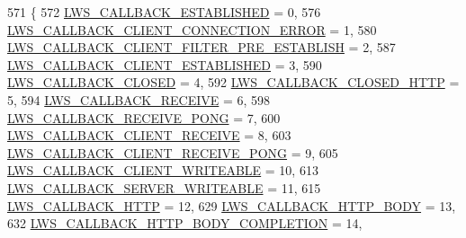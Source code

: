 \begin{DoxyCode}
571                           \{
572         \hyperlink{group__usercb_ggad62860e19975ba4c4af401c3cdb6abf7a24d39bf1cfc0bad9d92da9ac1717e439}{LWS\_CALLBACK\_ESTABLISHED}                                =  0,
576         \hyperlink{group__usercb_ggad62860e19975ba4c4af401c3cdb6abf7ad8c6207b0c4e732f3d507f0fb79370e8}{LWS\_CALLBACK\_CLIENT\_CONNECTION\_ERROR}                        =  
      1,
580         \hyperlink{group__usercb_ggad62860e19975ba4c4af401c3cdb6abf7aa536e574a642ff3ab9e12bff7ba2c6a2}{LWS\_CALLBACK\_CLIENT\_FILTER\_PRE\_ESTABLISH}                =  
      2,
587         \hyperlink{group__usercb_ggad62860e19975ba4c4af401c3cdb6abf7a7e12418eec9bce85735e6460176ab604}{LWS\_CALLBACK\_CLIENT\_ESTABLISHED}                          =  3,
590         \hyperlink{group__usercb_ggad62860e19975ba4c4af401c3cdb6abf7a48a9590e5e18c7920282e094a0bfd9d8}{LWS\_CALLBACK\_CLOSED}                                  =  4,
592         \hyperlink{group__usercb_ggad62860e19975ba4c4af401c3cdb6abf7a838b18d255c1b94a533287ba302a2eba}{LWS\_CALLBACK\_CLOSED\_HTTP}                                =  5,
594         \hyperlink{group__usercb_ggad62860e19975ba4c4af401c3cdb6abf7a492c1b1c0ac0ed980042ee732fe2990c}{LWS\_CALLBACK\_RECEIVE}                                        =  6,
598         \hyperlink{group__usercb_ggad62860e19975ba4c4af401c3cdb6abf7a2db02fc6e1c17ab62b52109d1aa9d738}{LWS\_CALLBACK\_RECEIVE\_PONG}                              =  7,
600         \hyperlink{group__usercb_ggad62860e19975ba4c4af401c3cdb6abf7abbbe7a0a67c5866ca9109d46823fc5b1}{LWS\_CALLBACK\_CLIENT\_RECEIVE}                          =  8,
603         \hyperlink{group__usercb_ggad62860e19975ba4c4af401c3cdb6abf7a136a7cec11c3afd13245623bd84e76c9}{LWS\_CALLBACK\_CLIENT\_RECEIVE\_PONG}                        =  9,
605         \hyperlink{group__usercb_ggad62860e19975ba4c4af401c3cdb6abf7a8e8b2e6dbeac76d8d126947d2166a514}{LWS\_CALLBACK\_CLIENT\_WRITEABLE}                              = 10,
613         \hyperlink{group__usercb_ggad62860e19975ba4c4af401c3cdb6abf7a7ec8e2e9557ee02a4fc9f7dec7e2babc}{LWS\_CALLBACK\_SERVER\_WRITEABLE}                              = 11,
615         \hyperlink{group__usercb_ggad62860e19975ba4c4af401c3cdb6abf7ae8d1de0bb56e03aa58cb4d44b18edd2e}{LWS\_CALLBACK\_HTTP}                                      = 12,
629         \hyperlink{group__usercb_ggad62860e19975ba4c4af401c3cdb6abf7ac4c68e00efcf1ff7bda7ada462aff8ae}{LWS\_CALLBACK\_HTTP\_BODY}                                    = 13,
632         \hyperlink{group__usercb_ggad62860e19975ba4c4af401c3cdb6abf7a2fce9a8608220f32abbf1422a5498804}{LWS\_CALLBACK\_HTTP\_BODY\_COMPLETION}                      = 14,

\end{DoxyCode}
